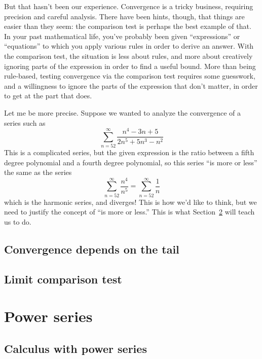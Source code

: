 \documentclass[justified]{tufte-book}
\newcommand{\xrefn}[1]{\ref{#1}}
\begin{document}
But that hasn't been our experience.  Convergence is a tricky
business, requiring precision and careful analysis.  There have been
hints, though, that things are easier than they seem: the comparison
test is perhaps the best example of that.  In your past mathematical
life, you've probably been given ``expressions'' or ``equations'' to
which you apply various rules in order to derive an answer.  With the
comparison test, the situation is less about rules, and more about
creatively ignoring parts of the expression in order to find a useful
bound.  More than being rule-based, testing convergence via the
comparison test requires some guesswork, and a willingness to ignore
the parts of the expression that don't matter, in order to get at the
part that does.

Let me be more precise.  Suppose we wanted to analyze the convergence of a series such as
\[
\sum_{n=52}^\infty \frac{n^4 - 3n + 5}{2n^5 + 5n^3 - n^2}
\]
This is a complicated series, but the given expression is the ratio
between a fifth degree polynomial and a fourth degree polynomial, so this series ``is more or less'' the same as the series
\[
\sum_{n=52}^\infty \frac{n^4}{n^5} = \sum_{n=52}^\infty \frac{1}{n}
\]
which is the harmonic series, and diverges!  This is how we'd like to
think, but we need to justify the concept of ``is more or less.''
This is what Section~\xrefn{section:limit-comparison-test} will teach
us to do.

\section{Convergence depends on the tail}
\label{section:convergence-for-tails}


\section{Limit comparison test}
\label{section:limit-comparison-test}


\chapter{Power series}
\label{chapter:power-series}



\section{Calculus with power series}
\label{section:calculus-with-power-series}

\end{document}
